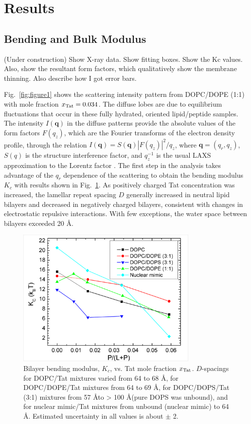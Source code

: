 \section{Results}
\subsection{Bending and Bulk Modulus}\label{sec:Kc_results}
(Under construction)
Show X-ray data. Show fitting boxes. Show the Kc values.
Also, show the resultant form factors, which qualitatively show the membrane thinning.
Also describe how I got error bars.

Fig.~\ref{fig:figure1} shows the scattering intensity pattern from DOPC/DOPE (1:1) with mole 
fraction $x_\textrm{Tat}=0.034$. The diffuse lobes are due to equilibrium fluctuations that occur 
in these fully hydrated, oriented lipid/peptide samples. The intensity $I(\mathbf{q})$ in the diffuse 
patterns provide the
absolute values of the form factors $F(q_z)$, which are the Fourier transforms 
of the electron density
profile, through the relation $I(\mathbf{q})=S(\mathbf{q})|F(q_z)|^2/q_z$, 
where $\mathbf{q}=(q_r,q_z)$, $S(q)$ is 
the structure
interference factor, and $q_z^{−1}$ is the usual LAXS approximation to the 
Lorentz factor \cite{Kucerka05_BPJ,Kucerka06,Kucerka05_JMB}.
The first step in the analysis takes advantage of the $q_r$ dependence of the 
scattering to obtain the
bending modulus $K_c$ with results shown in Fig.~\ref{fig:figure2}. 
As positively charged Tat concentration was increased, 
the lamellar repeat spacing $D$ generally increased in neutral lipid 
bilayers and decreased in negatively charged bilayers, consistent with changes in 
electrostatic repulsive interactions. 
With few exceptions, the water space between bilayers exceeded 20 \AA.

\begin{figure}[htbp]
  \centering
  \includegraphics[width=0.8\textwidth]{figures/Tat/figure2}
  \caption{Bilayer bending modulus, $K_c$, vs. Tat mole fraction $x_\textrm{Tat}$. 
  $D$-spacings for DOPC/Tat mixtures varied from 64 to 68 \AA, 
  for DOPC/DOPE/Tat mixtures from 64 to 69 \AA, 
  for DOPC/DOPS/Tat (3:1) mixtures from 57 \AA to > 100 \AA (pure DOPS was unbound), 
  and for nuclear mimic/Tat mixtures from unbound (nuclear mimic) to 64 \AA. 
  Estimated uncertainty in all values is about $\pm$ 2.}
  \label{fig:figure2}
\end{figure}

